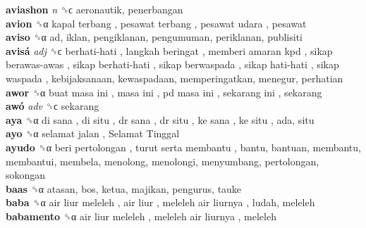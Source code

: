 \textbf{aviashon} \emph{n}  ␝ϲ  aeronautik, penerbangan  \\
\textbf{avion} ␝α   kapal terbang ,  pesawat terbang ,  pesawat udara , pesawat  \\
\textbf{aviso} ␝α  ad, iklan, pengiklanan, pengumuman, periklanan, publisiti  \\
\textbf{avisá} \emph{adj}  ␝ϲ   berhati-hati ,  langkah beringat ,  memberi amaran kpd ,  sikap berawas-awas ,  sikap berhati-hati ,  sikap berwaspada ,  sikap hati-hati ,  sikap waspada , kebijaksanaan, kewaspadaan, memperingatkan, menegur, perhatian  \\
\textbf{awor} ␝α   buat masa ini ,  masa ini ,  pd masa ini ,  sekarang ini , sekarang  \\
\textbf{awó} \emph{adv}  ␝ϲ  sekarang  \\
\textbf{aya} ␝α   di sana ,  di situ ,  dr sana ,  dr situ ,  ke sana ,  ke situ , ada, situ  \\
\textbf{ayo} ␝α   selamat jalan ,  Selamat Tinggal   \\
\textbf{ayudo} ␝α   beri pertolongan ,  turut serta membantu , bantu, bantuan, membantu, membantui, membela, menolong, menolongi, menyumbang, pertolongan, sokongan  \\
\textbf{baas} ␝α  atasan, bos, ketua, majikan, pengurus, tauke  \\
\textbf{baba} ␝α   air liur meleleh ,  air liur ,  meleleh air liurnya , ludah, meleleh  \\
\textbf{babamento} ␝α   air liur meleleh ,  meleleh air liurnya , meleleh  \\
